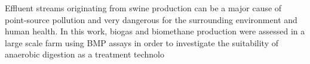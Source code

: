 Effluent streams originating from swine production can be a major cause of point-source pollution and very dangerous for the surrounding environment and human health. In this work, biogas and biomethane production were assessed in a large scale farm using BMP assays in order to investigate the suitability of anaerobic digestion as a treatment technolo